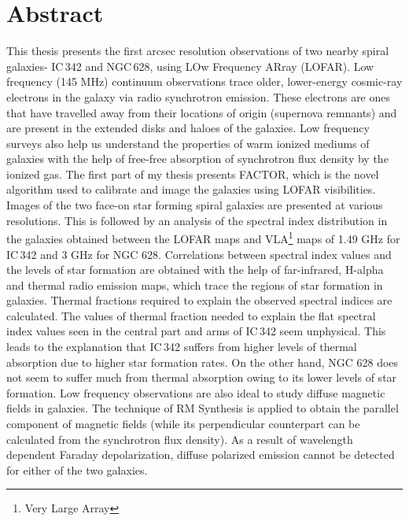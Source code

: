 \documentclass[../main/thesis_msc.tex]{subfiles}
\begin{document}
    \chapter*{Abstract}
    \thispagestyle{plain}


This thesis presents the first arcsec resolution observations of two nearby spiral galaxies- IC\,342 and NGC\,628, using LOw Frequency ARray (LOFAR). Low frequency (145 MHz) continuum observations trace older, lower-energy cosmic-ray electrons in the galaxy via radio synchrotron emission. These electrons are ones that have travelled away from their locations of origin (supernova remnants) and are present in the extended disks and haloes of the galaxies. Low frequency surveys also help us understand the properties of warm ionized mediums of galaxies with the help of free-free absorption of synchrotron flux density by the ionized gas. The first part of my thesis presents FACTOR, which is the novel algorithm used to calibrate and image the galaxies using LOFAR visibilities. Images of the two face-on star forming spiral galaxies are presented at various resolutions. This is followed by an analysis of the spectral index distribution in the galaxies obtained between the LOFAR maps and VLA\footnote{Very Large Array} maps of 1.49 GHz for IC\,342 and 3 GHz for NGC 628. Correlations between spectral index values and the levels of star formation are obtained with the help of far-infrared, H-alpha and thermal radio emission maps, which trace the regions of star formation in galaxies. Thermal fractions required to explain the observed spectral indices are calculated. The values of thermal fraction needed to explain the flat spectral index values seen in the central part and arms of IC\,342 seem unphysical. This leads to the explanation that IC\,342 suffers from higher levels of thermal absorption due to higher star formation rates. On the other hand, NGC 628 does not seem to suffer much from thermal absorption owing to its lower levels of star formation. Low frequency observations are also ideal to study diffuse magnetic fields in galaxies. The technique of RM Synthesis is applied to obtain the parallel component of magnetic fields (while its perpendicular counterpart can be calculated from the synchrotron flux density). As a result of wavelength dependent Faraday depolarization, diffuse polarized emission cannot be detected for either of the two galaxies.

    \clearpage
    \thispagestyle{empty}
\end{document}
